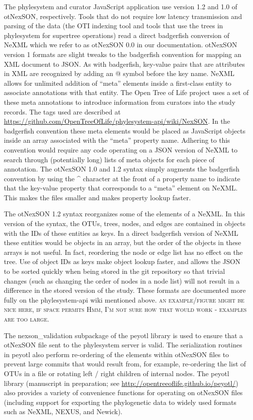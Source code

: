 \documentclass{bioinfo}
\newcommand{\ps}{phylesystem\xspace}
\newcommand{\otol}{Open Tree of Life\xspace}
\newcommand{\nexson}{otNexSON\xspace}
\newcommand{\js}{JavaScript\xspace}
\newcommand{\ejmcomment}[1]{{\color{green} \textsc{#1}}\xspace}
\newcommand{\jarcomment}[1]{{\color{yellow} \textsc{#1}}\xspace}
\begin{document}
\begin{methods}
The \ps and curator \js application use version 1.2 and 1.0 of \nexson, respectively.
Tools that do not require low latency transmission and parsing of the data (the OTI indexing tool
    and tools that use the trees in \ps for supertree operations)
    read a direct badgerfish \citep{badgerfish} conversion of NeXML which we refer to as \nexson 0.0 in our documentation.
\nexson version 1 formats are slight tweaks to the badgerfish convention \citep{badgerfish} for mapping an XML document to JSON.
As with badgerfish, key-value pairs that are attributes in XML are recognized by adding an @ symbol before the key name.
NeXML allows for unlimited addition of ``meta'' elements inside a first-class entity to associate annotations with that entity.
The \otol project uses a set of these meta annotations to introduce information from curators into the study records.
The tags used are described at \url{https://github.com/OpenTreeOfLife/phylesystem-api/wiki/NexSON}.
In the badgerfish convention these meta elements would be placed as \js objects inside an array associated with the ``meta'' property name.
Adhering to this convention would require any code operating on a JSON version of NeXML to search through (potentially
    long) lists of meta objects for each piece of annotation.
The \nexson 1.0 and 1.2 syntax simply augments the badgerfish convention by using the \^{} character at the front of a
    property name to indicate that the key-value property that corresponds to a ``meta'' element on NeXML.
This makes the files smaller and makes property lookup faster.

The \nexson 1.2 syntax reorganizes some of the elements of a NeXML.
In this version of the syntax, the OTUs, trees, nodes, and edges are contained in objects with the IDs of these entities as keys.
In a direct badgerfish version of NeXML these entities would be objects in an array, but the order of the objects
    in these arrays is not useful.
In fact, reordering the node or edge list has no effect on the tree.
Use of object IDs as keys make object lookup faster, and allows the JSON to be sorted quickly when being stored in 
    the git repository so that trivial changes (such as changing the order of nodes in a node list) will not result in 
    a difference in the stored version of the study.
These formats are documented more fully on the \ps-api wiki mentioned above.
\jarcomment{an example/figure might be nice here, if space permits}
\ejmcomment{Hmm, I'm not sure how that would work - examples are too large.}

The nexson\_validation subpackage of the peyotl library is used to ensure that a \nexson file sent to the \ps
    server is valid.
The serialization routines in peyotl also perform re-ordering of the elements within \nexson files to
    prevent large commits that would result from, for example, re-ordering the list of OTUs in a file or
    rotating left / right children of internal nodes.
The peyotl library (manuscript in preparation; see \url{http://opentreeoflife.github.io/peyotl/}) also 
    provides a variety of convenience functions for operating on \nexson files (including support
    for exporting the phylogenetic data to widely used formats such as NeXML, NEXUS, and Newick).


\end{methods}
\end{document}
